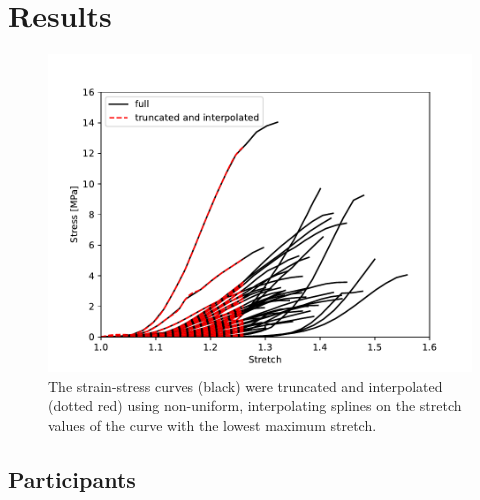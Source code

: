 \chapter{Results}

\begin{figure}
    \centering
    \includegraphics[width=\linewidth]{skinstression/images/truncated-and-interpolated-curves.pdf}
    \caption[Truncated and spline interpolated curves]{
        The strain-stress curves (black) were truncated and interpolated (dotted red)
        using non-uniform, interpolating splines on the stretch values of the curve with the lowest maximum stretch.
    }
    \label{fig:trunc_interp_curves}
\end{figure}

\section{Participants}

